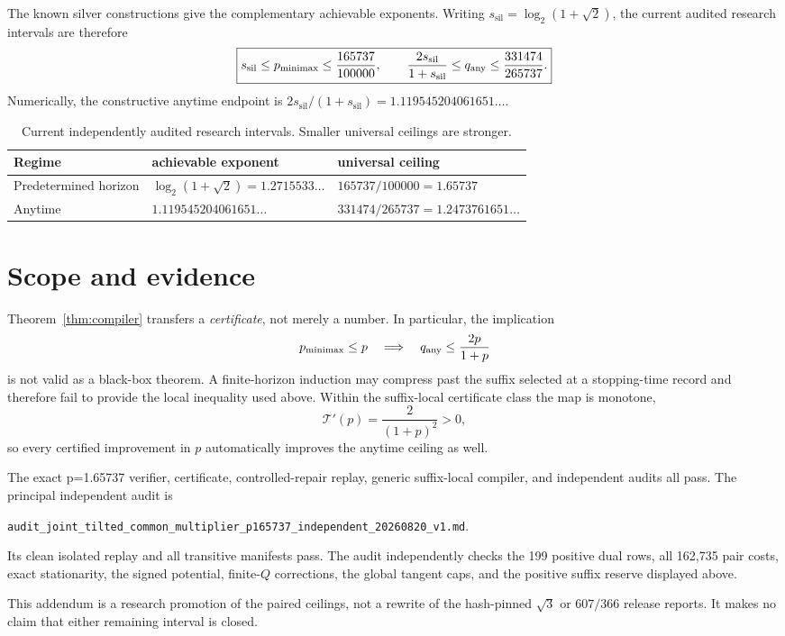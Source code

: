 \documentclass[11pt]{article}
\theoremstyle{remark}
\newcommand{\Transfer}{\mathcal T}
\newcommand{\silver}{\mathrm{sil}}
\begin{document}
The known silver constructions give the complementary achievable exponents.
Writing \(s_\silver=\log_2(1+\sqrt2)\), the current audited research
intervals are therefore
\begin{equation}
 \boxed{
 s_\silver\le p_{\rm minimax}\le\frac{165737}{100000},
 \qquad
 \frac{2s_\silver}{1+s_\silver}
 \le q_{\rm any}\le\frac{331474}{265737}.}
 \label{eq:intervals}
\end{equation}
Numerically, the constructive anytime endpoint is
\(2s_\silver/(1+s_\silver)=1.119545204061651\ldots\).

\begin{table}[ht]
\centering
\begin{tabular}{@{}lll@{}}
\toprule
Regime & achievable exponent & universal ceiling\\
\midrule
Predetermined horizon
 & \(\log_2(1+\sqrt2)=1.2715533\ldots\)
 & \(165737/100000=1.65737\)\\
Anytime
 & \(1.119545204061651\ldots\)
 & \(331474/265737=1.2473761651\ldots\)\\
\bottomrule
\end{tabular}
\caption{Current independently audited research intervals.  Smaller universal
ceilings are stronger.}
\end{table}

\clearpage
\section{Scope and evidence}

Theorem~\ref{thm:compiler} transfers a \emph{certificate}, not merely a
number.  In particular, the implication
\[
 p_{\rm minimax}\le p
 \quad\Longrightarrow\quad
 q_{\rm any}\le\frac{2p}{1+p}
\]
is not valid as a black-box theorem.  A finite-horizon induction may compress
past the suffix selected at a stopping-time record and therefore fail to
provide the local inequality used above.  Within the suffix-local certificate
class the map is monotone,
\[
 \Transfer'(p)=\frac2{(1+p)^2}>0,
\]
so every certified improvement in \(p\) automatically improves the anytime
ceiling as well.

The exact p=1.65737 verifier, certificate, controlled-repair replay, generic
suffix-local compiler, and independent audits all pass.  The principal
independent audit is
\begin{center}
\small
\texttt{audit\_joint\_tilted\_common\_multiplier\_p165737\_independent\_20260820\_v1.md}.
\end{center}
Its clean isolated replay and all transitive manifests pass.  The audit
independently checks the 199 positive dual rows, all 162,735 pair costs,
exact stationarity, the signed potential, finite-\(Q\) corrections, the
global tangent caps, and the positive suffix reserve displayed above.

This addendum is a research promotion of the paired ceilings, not a rewrite
of the hash-pinned \(\sqrt3\) or \(607/366\) release reports.  It makes no
claim that either remaining interval is closed.
\end{document}
